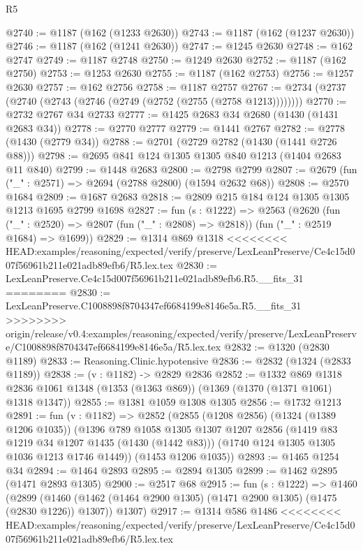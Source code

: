 \begin{lexlean}{R5}
\begin{coremodule}
{{{{{{{{{{{{{{{{{{{{{{{{{{{{{{{{{{{{{{{{{{{{{{{{{{{{{{{{{{{{{{{{{{{{{{{{{{{{{{{{{{{{@2740 := @1187 (@162 (@1233 @2630))
@2743 := @1187 (@162 (@1237 @2630))
@2746 := @1187 (@162 (@1241 @2630))
@2747 := @1245 @2630
@2748 := @162 @2747
@2749 := @1187 @2748
@2750 := @1249 @2630
@2752 := @1187 (@162 @2750)
@2753 := @1253 @2630
@2755 := @1187 (@162 @2753)
@2756 := @1257 @2630
@2757 := @162 @2756
@2758 := @1187 @2757
@2767 := @2734 (@2737 (@2740 (@2743 (@2746 (@2749 (@2752 (@2755 (@2758 @1213))))))))
@2770 := @2732 @2767 @34 @2733
@2777 := @1425 @2683 @34 @2680 (@1430 (@1431 @2683 @34))
@2778 := @2770 @2777
@2779 := @1441 @2767
@2782 := @2778 (@1430 (@2779 @34))
@2788 := @2701 (@2729 @2782 (@1430 (@1441 @2726 @88)))
@2798 := @2695 @841 @124 @1305 @1305 @840 @1213 (@1404 @2683 @11 @840)
@2799 := @1448 @2683
@2800 := @2798 @2799
@2807 := @2679 (fun ("_" : @2571) => @2694 (@2788 @2800) (@1594 @2632 @68))
@2808 := @2570 @1684
@2809 := @1687 @2683
@2818 := @2809 @215 @184 @124 @1305 @1305 @1213 @1695 @2799 @1698
@2827 := fun (s : @1222) =>
  @2563
    (@2620
      (fun ("_" : @2520) => @2807 (fun ("_" : @2808) => @2818))
      (fun ("_" : @2519 @1684) => @1699))
@2829 := @1314 @869 @1318
<<<<<<<< HEAD:examples/reasoning/expected/verify/preserve/LexLeanPreserve/Ce4c15d007f56961b211e021adb89efb6/R5.lex.tex
@2830 := LexLeanPreserve.Ce4c15d007f56961b211e021adb89efb6.R5.__fits_31
========
@2830 := LexLeanPreserve.C1008898f8704347ef6684199e8146e5a.R5.__fits_31
>>>>>>>> origin/release/v0.4:examples/reasoning/expected/verify/preserve/LexLeanPreserve/C1008898f8704347ef6684199e8146e5a/R5.lex.tex
@2832 := @1320 (@2830 @1189)
@2833 := Reasoning.Clinic.hypotensive
@2836 := @2832 (@1324 (@2833 @1189))
@2838 := (v : @1182) -> @2829 @2836
@2852 := @1332
    @869
    @1318
    @2836
    @1061
    @1348
    (@1353 (@1363 @869))
    (@1369 (@1370 (@1371 @1061) @1318 @1347))
@2855 := @1381 @1059 @1308 @1305
@2856 := @1732 @1213
@2891 := fun (v : @1182) =>
  @2852
    (@2855
      (@1208 @2856)
      (@1324 (@1389 @1206 @1035))
      (@1396
        @789
        @1058
        @1305
        @1307
        @1207
        @2856
        (@1419 @83 @1219 @34 @1207 @1435 (@1430 (@1442 @83)))
        (@1740 @124 @1305 @1305 @1036 @1213 @1746 @1449))
      (@1453 @1206 @1035))
@2893 := @1465 @1254 @34
@2894 := @1464 @2893
@2895 := @2894 @1305
@2899 := @1462 @2895 (@1471 @2893 @1305)
@2900 := @2517 @68
@2915 := fun (s : @1222) =>
  @1460
    (@2899
      (@1460 (@1462 (@1464 @2900 @1305) (@1471 @2900 @1305) (@1475 (@2830 @1226)) @1307))
      @1307)
@2917 := @1314 @586 @1486
<<<<<<<< HEAD:examples/reasoning/expected/verify/preserve/LexLeanPreserve/Ce4c15d007f56961b211e021adb89efb6/R5.lex.tex
}}}}}}}}}}}}}}}}}}}}}}}}}}}}}}}}}}}}}}}}}}}}}}}}}}}}}}}}}}}}}}}}}}}}}}}}}}}}}}}}}}}}
\end{coremodule}
\end{lexlean}
